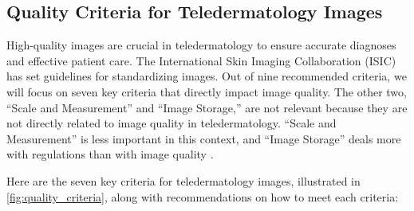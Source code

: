 \subsection{Quality Criteria for Teledermatology Images}
\label{sub:QualityCriteriaTeledermatology}
High-quality images are crucial in teledermatology to ensure accurate diagnoses and effective patient care. The International Skin Imaging Collaboration (ISIC)  has set guidelines for standardizing images. Out of nine recommended criteria, we will focus on seven key criteria that directly impact image quality. The other two, “Scale and Measurement” and “Image Storage,” are not relevant because they are not directly related to image quality in teledermatology. “Scale and Measurement” is less important in this context, and “Image Storage” deals more with regulations than with image quality \autocite{TDCriteria}. \par
\vspace{\baselineskip}
\noindent
Here are the seven key criteria for teledermatology images, illustrated in \autoref{fig:quality_criteria}, along with recommendations on how to meet each criteria:
\vspace{\baselineskip}
